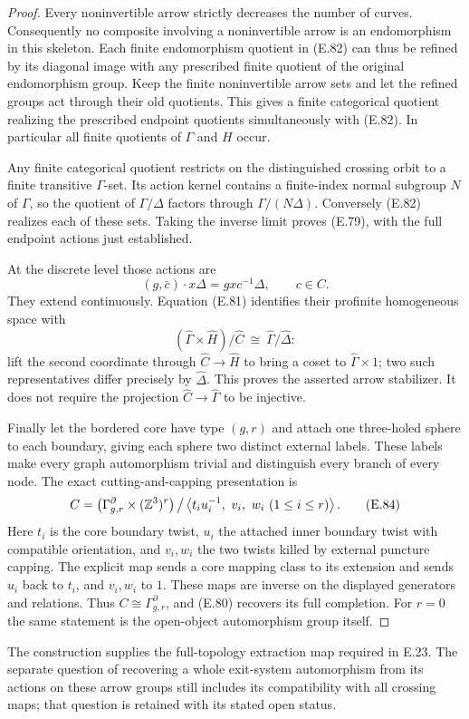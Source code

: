 \begin{proof}
Every noninvertible arrow strictly decreases the number of
curves.  Consequently no composite involving a noninvertible
arrow is an endomorphism in this skeleton.  Each finite
endomorphism quotient in (E.82) can thus be refined by its
diagonal image with any prescribed finite quotient of the
original endomorphism group.  Keep the finite noninvertible
arrow sets and let the refined groups act through their old
quotients.  This gives a finite categorical quotient realizing
the prescribed endpoint quotients simultaneously with (E.82).
In particular all finite quotients of $\Gamma$ and $H$ occur.

Any finite categorical quotient restricts on the distinguished
crossing orbit to a finite transitive $\Gamma$-set.  Its action
kernel contains a finite-index normal subgroup $N$ of $\Gamma$,
so the quotient of $\Gamma/\Delta$ factors through
$\Gamma/(N\Delta)$.  Conversely (E.82) realizes each of these
sets.  Taking the inverse limit proves (E.79), with the full
endpoint actions just established.

At the discrete level those actions are
\[
 (g,\bar c)\cdot x\Delta=gxc^{-1}\Delta,
                  \qquad c\in C.
\]
They extend continuously.  Equation (E.81) identifies their
profinite homogeneous space with
\[
 (\widehat\Gamma\times\widehat H)/\widehat C
                 \ \cong\ \widehat\Gamma/\widehat\Delta:
                                                               \tag{E.83}
\]
lift the second coordinate through $\widehat C\to\widehat H$
to bring a coset to $\widehat\Gamma\times1$; two such
representatives differ precisely by $\widehat\Delta$.
This proves the asserted arrow stabilizer.  It does not require
the projection $\widehat C\to\widehat\Gamma$ to be injective.

Finally let the bordered core have type $(g,r)$ and attach one
three-holed sphere to each boundary, giving each sphere two
distinct external labels.  These labels make every graph
automorphism trivial and distinguish every branch of every
node.  The exact cutting-and-capping presentation is
\[
 C=\left(\Gamma_{g,r}^{\partial}\times(\mathbb Z^3)^r\right)
    \big/\left\langle
       t_i u_i^{-1},\ v_i,\ w_i\ (1\leq i\leq r)
    \right\rangle.                                           \tag{E.84}
\]
Here $t_i$ is the core boundary twist, $u_i$ the attached
inner boundary twist with compatible orientation, and
$v_i,w_i$ the two twists killed by external puncture capping.
The explicit map sends a core mapping class to its extension
and sends $u_i$ back to $t_i$, and $v_i,w_i$ to $1$.
These maps are inverse on the displayed generators and
relations.  Thus $C\cong\Gamma_{g,r}^{\partial}$, and (E.80)
recovers its full completion.  For $r=0$ the same statement
is the open-object automorphism group itself.
\end{proof}

The construction supplies the full-topology extraction map
required in E.23.  The separate question of recovering a whole
exit-system automorphism from its actions on these arrow
groups still includes its compatibility with all crossing
maps; that question is retained with its stated open status.
